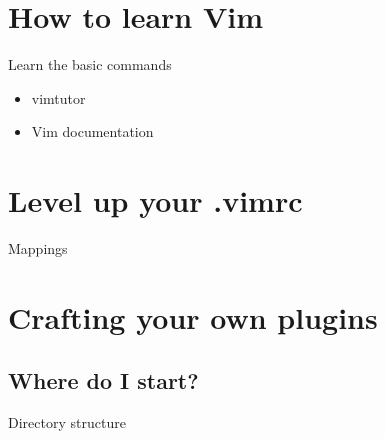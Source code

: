 \documentclass{beamer}
\begin{document}
    \section{How to learn Vim}
    \begin{frame}{Learn the basic commands}
        \begin{itemize}
            \item <alert@+> vimtutor
            \item <alert@+> Vim documentation
        \end{itemize}
    \end{frame}
    \section{Level up your .vimrc}
    \begin{frame}{Mappings}
    \end{frame}
    \section{Crafting your own plugins}
    \subsection{Where do I start?}
    \begin{frame}{Directory structure}
    \end{frame}
\end{document}
